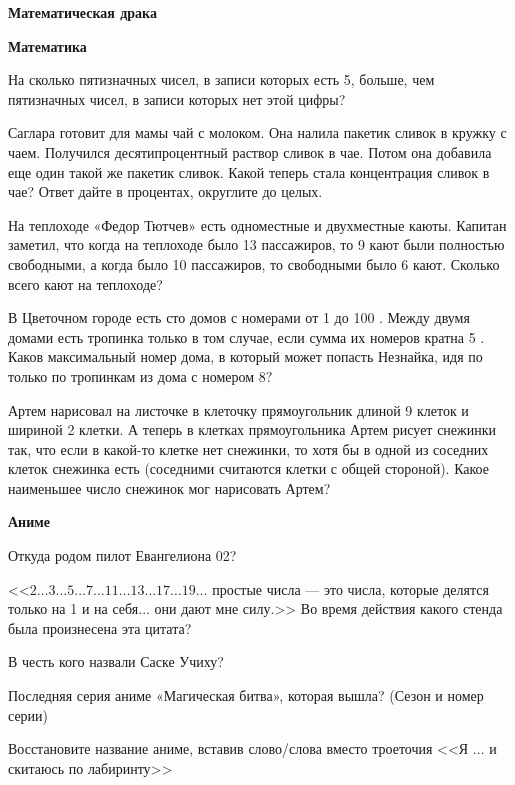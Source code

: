 \centerline{\bf \Huge Математическая драка}

\textbf{\Large Математика}

На сколько пятизначных чисел, в записи которых есть 5, больше, чем пятизначных чисел, в записи которых нет этой цифры?

Саглара готовит для мамы чай с молоком. Она налила пакетик сливок в кружку с чаем. Получился десятипроцентный раствор сливок в чае. Потом она добавила еще один такой же пакетик сливок. Какой теперь стала концентрация сливок в чае? Ответ дайте в процентах, округлите до целых.

На теплоходе «Федор Тютчев» есть одноместные и двухместные каюты. Капитан заметил, что когда на теплоходе было 13 пассажиров, то 9 кают были полностью свободными, а когда было 10 пассажиров, то свободными было 6 кают. Сколько всего кают на теплоходе?

В Цветочном городе есть сто домов с номерами от 1 до 100 . Между двумя домами есть тропинка только в том случае, если сумма их номеров кратна 5 . Каков максимальный номер дома, в который может попасть Незнайка, идя по только по тропинкам из дома с номером $8 ?$

Артем нарисовал на листочке в клеточку прямоугольник длиной 9 клеток и шириной 2 клетки. А теперь в клетках прямоугольника Артем рисует снежинки так, что если в какой-то клетке нет снежинки, то хотя бы в одной из соседних клеток снежинка есть (соседними считаются клетки с общей стороной). Какое наименьшее число снежинок мог нарисовать Артем?

\textbf{\Large Аниме}

Откуда родом пилот Евангелиона 02?

<<$2\ldots3\ldots5\ldots7\ldots11\ldots13\ldots17\ldots19\ldots$ простые числа --- это числа, которые делятся только на 1 и на себя... они дают мне силу.>> Во время действия какого стенда была произнесена эта цитата?

В честь кого назвали Саске Учиху?

Последняя серия аниме «Магическая битва», которая вышла? (Сезон и номер серии)

\newpage

\hspace{3mm}

Восстановите название аниме, вставив слово/слова вместо троеточия <<Я ... и скитаюсь по лабиринту>> 

